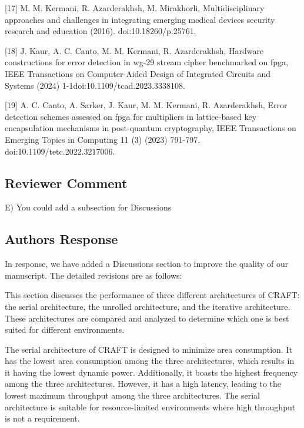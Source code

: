 [17] M. M. Kermani, R. Azarderakhsh, M. Mirakhorli, Multidisciplinary approaches and challenges in integrating emerging medical devices security research and education (2016). \linebreak doi:10.18260/p.25761.


[18] J. Kaur, A. C. Canto, M. M. Kermani, R. Azarderakhsh, Hardware constructions for error detection in wg-29 stream cipher benchmarked on fpga, IEEE Transactions on Computer-Aided Design of Integrated Circuits and Systems (2024) 1-1doi:10.1109/tcad.2023.3338108.

[19] A. C. Canto, A. Sarker, J. Kaur, M. M. Kermani, R. Azarderakhsh, Error detection schemes assessed on fpga for multipliers in lattice-based key encapsulation mechanisms in post-quantum cryptography, IEEE Transactions on Emerging Topics in Computing 11 (3) (2023) 791-797. doi:10.1109/tetc.2022.3217006.


\color{black}



\subsection{Reviewer Comment}
E) You could add a subsection for Discussions

\subsection{Authors Response}

In response, we have added a Discussions section to improve the quality of our manuscript. The detailed revisions are as follows:

\color{blue}

This section discusses the performance of three different architectures of CRAFT: the serial architecture, the unrolled architecture, and the iterative architecture. These architectures are compared and analyzed to determine which one is best suited for different environments.

The serial architecture of CRAFT is designed to minimize area consumption. It has the lowest area consumption among the three architectures, which results in it having the lowest dynamic power. Additionally, it boasts the highest frequency among the three architectures. However, it has a high latency, leading to the lowest maximum throughput among the three architectures. The serial architecture is suitable for resource-limited environments where high throughput is not a requirement.

